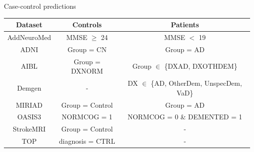 \documentclass[t]{beamer}
\begin{document}
	\begin{frame}{Case-control predictions} %
		\centering
		\vfill
	    \begin{tabular}{|c|c|c|}
            \hline
             \textbf{\scriptsize{Dataset}}&\textbf{\scriptsize{Controls}}&\textbf{\scriptsize{Patients}}\\
            \hline
            \scriptsize{AddNeuroMed}&\scriptsize{MMSE $\geq$ 24}&\scriptsize{MMSE $<$ 19}\\
            \hline
            \scriptsize{ADNI}&\scriptsize{Group = CN}&\scriptsize{Group = AD}\\
            \hline
            \scriptsize{AIBL}&\scriptsize{Group = DXNORM}&\scriptsize{Group $\in$ \{DXAD, DXOTHDEM\}}\\
            \hline
            \scriptsize{Demgen}&\scriptsize{-}&\scriptsize{DX $\in$ \{AD, OtherDem, UnspecDem, VaD\}}\\
            \hline
            \scriptsize{MIRIAD}&\scriptsize{Group = Control}&\scriptsize{Group = AD}\\
            \hline
            \scriptsize{OASIS3}&\scriptsize{NORMCOG = 1}&\scriptsize{NORMCOG = 0 \& DEMENTED = 1}\\
            \hline
            \scriptsize{StrokeMRI}&\scriptsize{Group = Control}&\scriptsize{-}\\
            \hline
            \scriptsize{TOP}&\scriptsize{diagnosis = CTRL}&\scriptsize{-}\\
            \hline
        \end{tabular}
		\vfill
	\end{frame}
\end{document}
